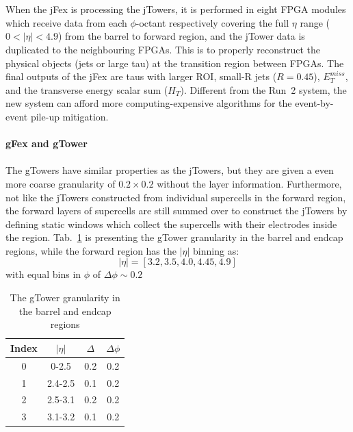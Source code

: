 \\
\\When the jFex is processing the jTowers, it is performed in eight FPGA modules which receive data from each $\phi$-octant respectively covering the full $\eta$ range ($0<|\eta|<4.9$) from the barrel to forward region, and the jTower data is duplicated to the neighbouring FPGAs\cite{Aad:1602235}. This is to properly reconstruct the physical objects (jets or large tau) at the transition region between FPGAs. The final outputs of the jFex are taus with larger ROI, small-R jets ($R=0.45$), $E^{miss}_{T}$, and the transverse energy scalar sum ($H_{T}$). Different from the Run~2 system, the new system can afford more computing-expensive algorithms for the event-by-event pile-up mitigation. 
\\
\\{\bf gFex and gTower}
\\
\\The gTowers have similar properties as the jTowers, but they are given a even more coarse granularity of $0.2\times0.2$ without the layer information. Furthermore, not like the jTowers constructed from individual supercells in the forward region, the forward layers of supercells are still summed over to construct the jTowers by defining static windows which collect the supercells with their electrodes inside the region. Tab.~\ref{Tab:granularity_gT} is presenting the gTower granularity in the barrel and endcap regions, while the forward region has the $|\eta|$ binning as:
\begin{equation}
|\eta| = \left[3.2, 3.5, 4.0, 4.45, 4.9\right]
\end{equation}
with equal bins in $\phi$ of $\Delta\phi\sim0.2$
\begin{table}[h]
	\caption{The gTower granularity in the barrel and endcap regions}
	\renewcommand{\arraystretch}{1.3}
	\centering
	\begin{tabular}{| c | c | c | c | }
		\hline
		\hline
		Index      &    $|\eta|$        &     $\Delta$     & $\Delta\phi$   \\
		\hline
		0          &     0-2.5          & 0.2                          &  0.2                          \\
		\hline
		1          &     2.4-2.5           & 0.1                          &  0.2                         \\
		\hline
		2      &     2.5-3.1       & 0.2                      &  0.2                       \\
		\hline 
		3      &     3.1-3.2       & 0.1                      &  0.2                       \\
		\hline
		\hline
	\end{tabular}
	\label{Tab:granularity_gT}
\end{table}
